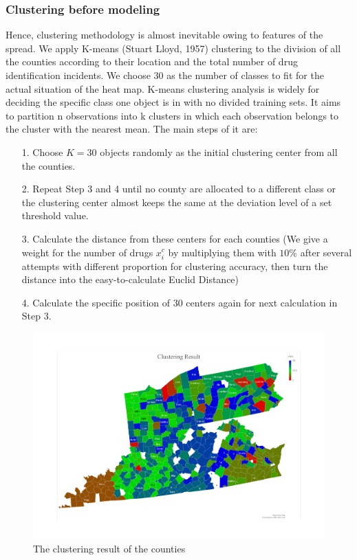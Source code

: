 \documentclass{mcmthesis}
\begin{document}
\subsubsection{Clustering before modeling}
Hence, clustering methodology is almost inevitable owing to features of the spread. We apply K-means (Stuart Lloyd, 1957) clustering to the division of all the counties according to their location and the total number of drug identification incidents. We choose 30 as the number of classes to fit for the actual situation of the heat map.
K-means clustering analysis is widely for deciding the specific class one object is in with no divided training sets. It aims to partition n observations into k clusters in which each observation belongs to the cluster with the nearest mean. The main steps of it are:
\begin{itemize}
	\item[1. ] Choose $K=30$ objects randomly as the initial clustering center from all the counties.
	\item[2. ] Repeat Step 3 and 4 until no county are allocated to a different class or the clustering center almost keeps the same at the deviation level of a set threshold value.
	\item[3. ] Calculate the distance from these centers for each counties (We give a weight for the number of drugs $x^c_i$ by multiplying them with $10\%$ after several attempts with different proportion for clustering accuracy, then turn the distance into the easy-to-calculate Euclid Distance)
	\item[4. ] Calculate the specific position of 30 centers again for next calculation in Step 3.
\end{itemize}


\begin{figure}[htbp!]
  \centering
  \includegraphics[width = 12 cm]{Clustering_3.pdf}
  \caption{The clustering result of the counties}\label{4}
\end{figure}
\end{document}
